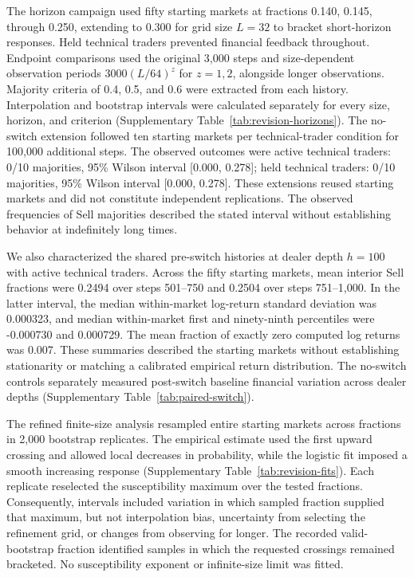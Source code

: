 The horizon campaign used fifty starting markets at fractions
0.140, 0.145, through 0.250, extending to 0.300 for grid size $L=32$ to bracket
short-horizon responses. Held technical traders prevented financial
feedback throughout. Endpoint comparisons used the original 3,000 steps
and size-dependent observation periods $3000(L/64)^z$ for $z=1,2$, alongside longer
observations. Majority criteria of 0.4, 0.5, and 0.6 were extracted
from each history. Interpolation and bootstrap intervals were calculated
separately for every size, horizon, and criterion
(Supplementary Table~\ref{tab:revision-horizons}). The no-switch
extension followed ten starting markets per technical-trader condition for
100,000 additional steps. The observed outcomes were active technical traders: 0/10 majorities, 95\% Wilson interval [0.000, 0.278]; held technical traders: 0/10 majorities, 95\% Wilson interval [0.000, 0.278].
These extensions reused starting markets and did not constitute
independent replications. The observed frequencies of Sell majorities described
the stated interval without establishing behavior at indefinitely long
times.

We also characterized the shared pre-switch histories at dealer depth $h=100$ with
active technical traders. Across the fifty starting markets, mean
interior Sell fractions were 0.2494 over
steps 501--750 and 0.2504 over steps
751--1,000. In the latter interval, the median within-market log-return
standard deviation was 0.000323, and
median within-market first and ninety-ninth percentiles were
-0.000730 and
0.000729. The mean fraction of exactly
zero computed log returns was 0.007.
These summaries described the starting markets without establishing
stationarity or matching a calibrated empirical return distribution.
The no-switch controls separately measured post-switch baseline
financial variation across dealer depths
(Supplementary Table~\ref{tab:paired-switch}).

The refined finite-size analysis resampled entire starting markets across
fractions in 2,000 bootstrap replicates. The empirical estimate used the
first upward crossing and allowed local decreases in probability, while
the logistic fit imposed a smooth increasing response
(Supplementary Table~\ref{tab:revision-fits}). Each replicate reselected
the susceptibility maximum over the tested fractions. Consequently,
intervals included variation in which sampled fraction supplied that
maximum, but not interpolation bias, uncertainty from selecting the
refinement grid, or changes from observing for longer. The recorded
valid-bootstrap fraction identified samples in which the requested
crossings remained bracketed. No susceptibility exponent or
infinite-size limit was fitted.
